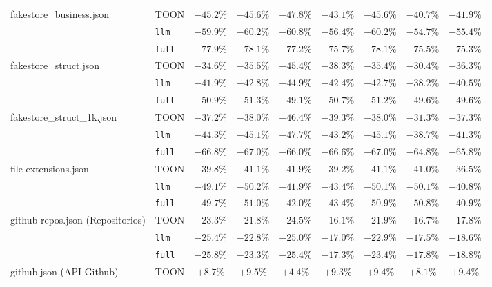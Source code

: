 \begin{table}[t]
\begin{tabular}{@{}llccccccc@{}}
    \cline{2-9}
    \multirow{3}{*}{fakestore\_business.json} & TOON & $-45.2\%$ & $-45.6\%$ & $-47.8\%$ & $-43.1\%$ & $-45.6\%$ & $-40.7\%$ & $-41.9\%$ \\
     & \texttt{llm} & $-59.9\%$ & $-60.2\%$ & $-60.8\%$ & $-56.4\%$ & $-60.2\%$ & $-54.7\%$ & $-55.4\%$ \\
     & \texttt{full} & $-77.9\%$ & $-78.1\%$ & $-77.2\%$ & $-75.7\%$ & $-78.1\%$ & $-75.5\%$ & $-75.3\%$ \\
    \cline{2-9}
    \multirow{3}{*}{fakestore\_struct.json} & TOON & $-34.6\%$ & $-35.5\%$ & $-45.4\%$ & $-38.3\%$ & $-35.4\%$ & $-30.4\%$ & $-36.3\%$ \\
     & \texttt{llm} & $-41.9\%$ & $-42.8\%$ & $-44.9\%$ & $-42.4\%$ & $-42.7\%$ & $-38.2\%$ & $-40.5\%$ \\
     & \texttt{full} & $-50.9\%$ & $-51.3\%$ & $-49.1\%$ & $-50.7\%$ & $-51.2\%$ & $-49.6\%$ & $-49.6\%$ \\
    \cline{2-9}
    \multirow{3}{*}{fakestore\_struct\_1k.json} & TOON & $-37.2\%$ & $-38.0\%$ & $-46.4\%$ & $-39.3\%$ & $-38.0\%$ & $-31.3\%$ & $-37.3\%$ \\
     & \texttt{llm} & $-44.3\%$ & $-45.1\%$ & $-47.7\%$ & $-43.2\%$ & $-45.1\%$ & $-38.7\%$ & $-41.3\%$ \\
     & \texttt{full} & $-66.8\%$ & $-67.0\%$ & $-66.0\%$ & $-66.6\%$ & $-67.0\%$ & $-64.8\%$ & $-65.8\%$ \\
    \cline{2-9}
    \multirow{3}{*}{file-extensions.json} & TOON & $-39.8\%$ & $-41.1\%$ & $-41.9\%$ & $-39.2\%$ & $-41.1\%$ & $-41.0\%$ & $-36.5\%$ \\
     & \texttt{llm} & $-49.1\%$ & $-50.2\%$ & $-41.9\%$ & $-43.4\%$ & $-50.1\%$ & $-50.1\%$ & $-40.8\%$ \\
     & \texttt{full} & $-49.7\%$ & $-51.0\%$ & $-42.0\%$ & $-43.4\%$ & $-50.9\%$ & $-50.8\%$ & $-40.9\%$ \\
    \cline{2-9}
    \multirow{3}{*}{github-repos.json (Repositorios)} & TOON & $-23.3\%$ & $-21.8\%$ & $-24.5\%$ & $-16.1\%$ & $-21.9\%$ & $-16.7\%$ & $-17.8\%$ \\
     & \texttt{llm} & $-25.4\%$ & $-22.8\%$ & $-25.0\%$ & $-17.0\%$ & $-22.9\%$ & $-17.5\%$ & $-18.6\%$ \\
     & \texttt{full} & $-25.8\%$ & $-23.3\%$ & $-25.4\%$ & $-17.3\%$ & $-23.4\%$ & $-17.8\%$ & $-18.8\%$ \\
    \cline{2-9}
    \multirow{3}{*}{github.json (API Github)} & TOON & $+8.7\%$ & $+9.5\%$ & $+4.4\%$ & $+9.3\%$ & $+9.4\%$ & $+8.1\%$ & $+9.4\%$ \\

\end{tabular}
\end{table}
